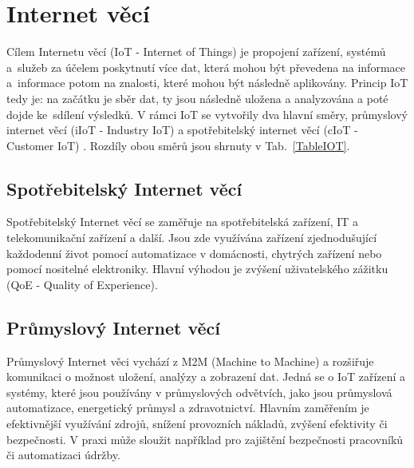 \chapter{Internet věcí}

Cílem Internetu věcí (IoT - Internet of Things) je propojení zařízení, systémů a~služeb za účelem poskytnutí více dat, která mohou být převedena na informace a~informace potom na znalosti, které mohou být následně aplikovány. Princip IoT tedy je: na začátku je sběr dat, ty jsou následně uložena a analyzována a poté dojde ke~sdílení výsledků. V rámci IoT se vytvořily dva hlavní směry, průmyslový internet věcí (iIoT - Industry IoT) a spotřebitelský internet věcí (cIoT - Customer IoT) \cite{iot_svet_hardware_internet_veci, iot_pohanka_internet_veci}. Rozdíly obou směrů jsou shrnuty v Tab.~\ref{TableIOT}.

\section{Spotřebitelský Internet věcí}
Spotřebitelský Internet věcí se zaměřuje na spotřebitelská zařízení, IT a telekomunikační zařízení a další. Jsou zde využívána zařízení zjednodušující každodenní život pomocí automatizace v domácnosti, chytrých zařízení nebo pomocí nositelné elektroniky. Hlavní výhodou je zvýšení uživatelského zážitku (QoE - Quality of Experience).

\section{Průmyslový Internet věcí}
Průmyslový Internet věci vychází z M2M (Machine to Machine) a rozšiřuje komunikaci o možnost uložení, analýzy a zobrazení dat. Jedná se o IoT zařízení a systémy, které jsou používány v průmyslových odvětvích, jako jsou průmyslová automatizace, energetický průmysl a zdravotnictví. Hlavním zaměřením je efektivnější využívání zdrojů, snížení provozních nákladů, zvýšení efektivity či bezpečnosti. V praxi může sloužit například pro zajištění bezpečnosti pracovníků či automatizaci údržby. 


